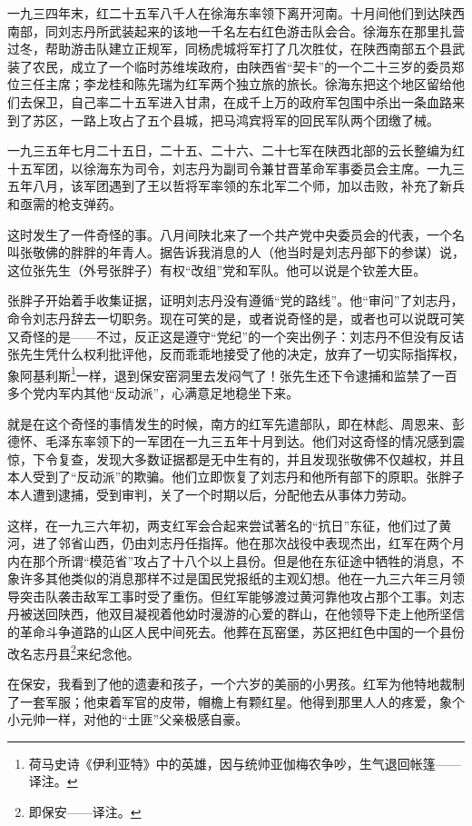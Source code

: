\documentclass[10pt]{book}
\begin{document}
一九三四年末，红二十五军八千人在徐海东率领下离开河南。十月间他们到达陕西南部，同刘志丹所武装起来的该地一千名左右红色游击队会合。徐海东在那里扎营过冬，帮助游击队建立正规军，同杨虎城将军打了几次胜仗，在陕西南部五个县武装了农民，成立了一个临时苏维埃政府，由陕西省“契卡”的一个二十三岁的委员郑位三任主席；李龙桂和陈先瑞为红军两个独立旅的旅长。徐海东把这个地区留给他们去保卫，自己率二十五军进入甘肃，在成千上万的政府军包围中杀出一条血路来到了苏区，一路上攻占了五个县城，把马鸿宾将军的回民军队两个团缴了械。

一九三五年七月二十五日，二十五、二十六、二十七军在陕西北部的云长整编为红十五军团，以徐海东为司令，刘志丹为副司令兼甘晋革命军事委员会主席。一九三五年八月，该军团遇到了王以哲将军率领的东北军二个师，加以击败，补充了新兵和亟需的枪支弹药。

这时发生了一件奇怪的事。八月间陕北来了一个共产党中央委员会的代表，一个名叫张敬佛的胖胖的年青人。据告诉我消息的人（他当时是刘志丹部下的参谋）说，这位张先生（外号张胖子）有权“改组”党和军队。他可以说是个钦差大臣。

张胖子开始着手收集证据，证明刘志丹没有遵循“党的路线”。他“审问”了刘志丹，命令刘志丹辞去一切职务。现在可笑的是，或者说奇怪的是，或者也可以说既可笑又奇怪的是——不过，反正这是遵守“党纪”的一个突出例子：刘志丹不但没有反诘张先生凭什么权利批评他，反而乖乖地接受了他的决定，放弃了一切实际指挥权，象阿基利斯\footnote{荷马史诗《伊利亚特》中的英雄，因与统帅亚伽梅农争吵，生气退回帐篷——译注。}一样，退到保安窑洞里去发闷气了！张先生还下令逮捕和监禁了一百多个党内军内其他“反动派”，心满意足地稳坐下来。

就是在这个奇怪的事情发生的时候，南方的红军先遣部队，即在林彪、周恩来、彭德怀、毛泽东率领下的一军团在一九三五年十月到达。他们对这奇怪的情况感到震惊，下令复查，发现大多数证据都是无中生有的，并且发现张敬佛不仅越权，并且本人受到了“反动派”的欺骗。他们立即恢复了刘志丹和他所有部下的原职。张胖子本人遭到逮捕，受到审判，关了一个时期以后，分配他去从事体力劳动。

这样，在一九三六年初，两支红军会合起来尝试著名的“抗日”东征，他们过了黄河，进了邻省山西，仍由刘志丹任指挥。他在那次战役中表现杰出，红军在两个月内在那个所谓“模范省”攻占了十八个以上县份。但是他在东征途中牺牲的消息，不象许多其他类似的消息那样不过是国民党报纸的主观幻想。他在一九三六年三月领导突击队袭击敌军工事时受了重伤。但红军能够渡过黄河靠他攻占那个工事。刘志丹被送回陕西，他双目凝视着他幼时漫游的心爱的群山，在他领导下走上他所坚信的革命斗争道路的山区人民中间死去。他葬在瓦窑堡，苏区把红色中国的一个县份改名志丹县\footnote{即保安——译注。}来纪念他。

在保安，我看到了他的遗妻和孩子，一个六岁的美丽的小男孩。红军为他特地裁制了一套军服；他束着军官的皮带，帽檐上有颗红星。他得到那里人人的疼爱，象个小元帅一样，对他的“土匪”父亲极感自豪。
\end{document}
